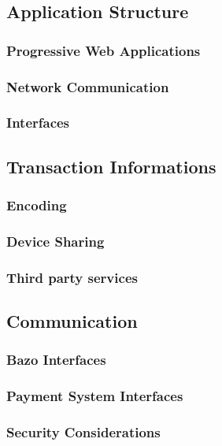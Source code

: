 \documentclass[a4paper]{article}
\begin{document}
\subsection{Application Structure}

\subsubsection{Progressive Web Applications}
\subsubsection{Network Communication}
\subsubsection{Interfaces}

\subsection{Transaction Informations}
\subsubsection{Encoding}
\subsubsection{Device Sharing}
\subsubsection{Third party services}


\subsection{Communication}
\subsubsection{Bazo Interfaces}
\subsubsection{Payment System Interfaces}

\subsubsection{Security Considerations}
\end{document}
